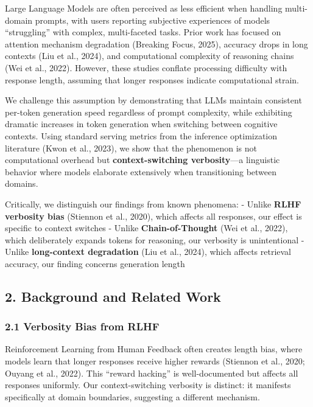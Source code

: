 \documentclass[
  11pt]{article}
\begin{document}
Large Language Models are often perceived as less efficient when
handling multi-domain prompts, with users reporting subjective
experiences of models ``struggling'' with complex, multi-faceted tasks.
Prior work has focused on attention mechanism degradation (Breaking
Focus, 2025), accuracy drops in long contexts (Liu et al., 2024), and
computational complexity of reasoning chains (Wei et al., 2022).
However, these studies conflate processing difficulty with response
length, assuming that longer responses indicate computational strain.

We challenge this assumption by demonstrating that LLMs maintain
consistent per-token generation speed regardless of prompt complexity,
while exhibiting dramatic increases in token generation when switching
between cognitive contexts. Using standard serving metrics from the
inference optimization literature (Kwon et al., 2023), we show that the
phenomenon is not computational overhead but \textbf{context-switching
verbosity}---a linguistic behavior where models elaborate extensively
when transitioning between domains.

Critically, we distinguish our findings from known phenomena: - Unlike
\textbf{RLHF verbosity bias} (Stiennon et al., 2020), which affects all
responses, our effect is specific to context switches - Unlike
\textbf{Chain-of-Thought} (Wei et al., 2022), which deliberately expands
tokens for reasoning, our verbosity is unintentional - Unlike
\textbf{long-context degradation} (Liu et al., 2024), which affects
retrieval accuracy, our finding concerns generation length

\subsection{2. Background and Related
Work}\label{background-and-related-work}

\subsubsection{2.1 Verbosity Bias from
RLHF}\label{verbosity-bias-from-rlhf}

Reinforcement Learning from Human Feedback often creates length bias,
where models learn that longer responses receive higher rewards
(Stiennon et al., 2020; Ouyang et al., 2022). This ``reward hacking'' is
well-documented but affects all responses uniformly. Our
context-switching verbosity is distinct: it manifests specifically at
domain boundaries, suggesting a different mechanism.
\end{document}
